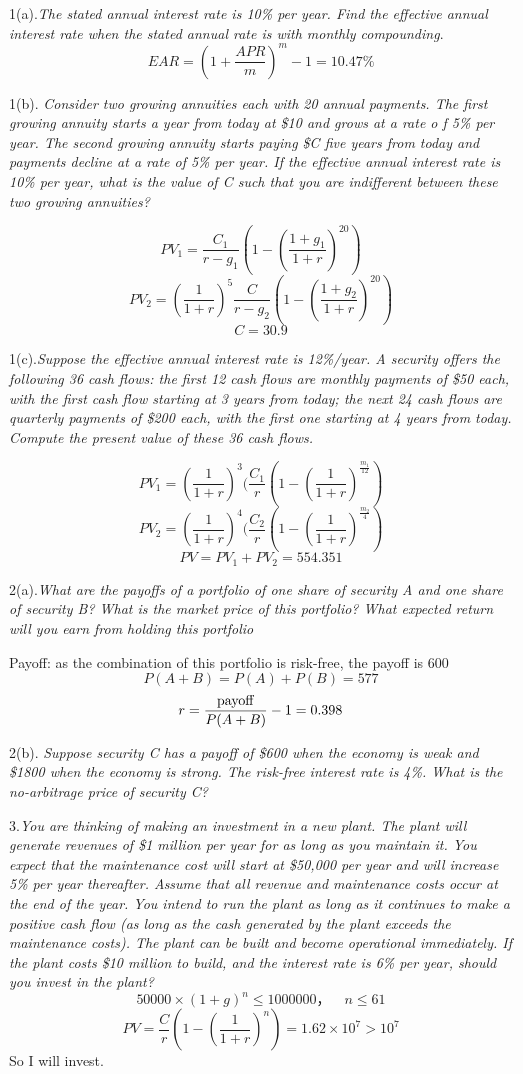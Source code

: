 \documentclass[10pt, a4paper]{article}
\begin{document}
1(a).\emph{The stated annual interest rate is 10\% per year. Find the effective annual interest rate when the stated annual rate is with monthly compounding}.
$$EAR = (1 + \frac{APR}{m})^m - 1 = 10.47\%$$

1(b). \emph{Consider two growing annuities each with 20 annual payments. The first growing annuity starts a year from today at \$10 and grows at a rate o  f 5\% per year. The second growing annuity starts paying \$C five years from today and payments decline at a rate of 5\% per year. If the effective annual interest rate is 10\% per year, what is the value of C such that you are indifferent between these two growing annuities?}

$$PV_1 = \frac{C_1}{r - g_1}(1 - (\frac{1 + g_1}{1 + r})^{20})$$
$$PV_2 = (\frac{1}{1 + r})^5\frac{C}{r - g_2}(1 - (\frac{1 + g_2}{1 + r})^{20})$$
$$C = 30.9$$

1(c).\emph{Suppose the effective annual interest rate is 12\%/year. A security offers the following 36 cash flows: the first 12 cash flows are monthly payments of 
\$50 each, with the first cash flow starting at 3 years from today; the next 24 cash flows are quarterly payments of \$200 each, with the first one starting at 4 years from today. 
Compute the present value of these 36 cash flows.}


$$PV_1 = (\frac{1}{1 + r}) ^ 3 (\frac{C_1}{r}(1 - (\frac{1}{1 + r})^{\frac{m_1}{12}})$$
$$PV_2 = (\frac{1}{1 + r}) ^ 4 (\frac{C_2}{r}(1 - (\frac{1}{1 + r})^{\frac{m_2}{4}})$$
$$PV = PV_1 + PV_2 = 554.351$$

2(a).\emph{What are the payoffs of a portfolio of one share of security A and one share of security B? What is the market price of this portfolio? What expected return will you earn from holding this portfolio}

Payoff: as the combination of this portfolio is risk-free, the payoff is 600
$$P(A + B) = P(A) + P(B) = 577$$
$$r = \frac{\rm{payoff}}{P(A + B)} - 1 = 0.398$$

2(b).\emph{ Suppose security C has a payoff of \$600 when the economy is weak and \$1800 when the economy is strong. The risk-free interest rate is 4\%. What is the no-arbitrage price of security C?}
\medskip

3.\emph{You are thinking of making an investment in a new plant. The plant will generate revenues of \$1 million per year for as long as you maintain it. You expect that the maintenance cost will start at \$50,000 per year and will increase 5\% per year thereafter. Assume that all revenue and maintenance costs occur at the end of the year. You intend to run the plant as long as it continues to make a positive cash flow (as long as the cash generated by the plant exceeds the maintenance costs). The plant can be built and become operational immediately. If the plant costs \$10 million to build, and the interest rate is 6\% per year, should you invest in the plant?}
$$50000 \times (1 + g) ^ n \leqslant 1000000，\quad n \leqslant 61$$
$$PV = \frac{C}{r}(1 - (\frac{1}{1 + r})^n) = 1.62 \times 10^7 > 10^7$$
So I will invest.
\medskip 
\end{document}
